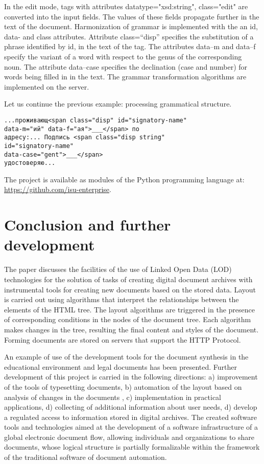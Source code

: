 \documentclass[12pt]{llncs}
\begin{document}
In the edit mode, tags with attributes
datatype="xsd:string", class="edit" are converted into the input
fields. The values of these fields propagate further in the text of the
document. Harmonization of grammar is implemented with the an id, data-
and class attributes. Attribute class=``disp'' specifies the
substitution of a phrase identified by id, in the text of the tag. The
attributes data--m and data--f specify the variant of a word with respect
to the genus of the corresponding noun. The attribute data--case
specifies the declination (case and number) for words being filled in in
the text. The grammar transformation algorithms are implemented on the
server.

Let us continue the previous example: processing grammatical structure.

\begin{verbatim}
...проживающ<span class="disp" id="signatory-name" 
data-m="ий" data-f="ая">___</span> по
адресу:... Подпись <span class="disp string"
id="signatory-name"
data-case="gent">___</span>
удостоверяю...
\end{verbatim}

The project is available as modules of the Python programming language
at: \url{https://github.com/isu-enterprise}.

\section{Conclusion and further development}
\label{sec:conc}

The paper discusses the facilities of the use of Linked Open Data (LOD)
technologies for the solution of tasks of {creating} digital document
archives with instrumental tools for creating new documents based on the
stored data. Layout is carried out using algorithms that interpret the
relationships between the elements of the HTML tree. The layout
algorithms are triggered in the presence of corresponding conditions in
the nodes of the document tree. Each algorithm makes changes in the
tree, resulting the final content and styles of the document. Forming
documents are stored on servers that support the HTTP Protocol.

An example of use of the development tools for the document synthesis in
the educational environment and legal documents has been presented.
Further development of this project is carried in the following
directions: a) improvement of the tools of typesetting documents, b)
automation of the layout based on analysis of changes in the documents
\cite{b2}, c) implementation in practical applications, d) collecting of
additional information about user needs, d) develop a regulated access
to information stored in digital archives. The created software tools
and technologies aimed at the development of a software infrastructure
of a global electronic document flow, allowing individuals and
organizations to share documents, whose logical structure is partially
formalizable within the framework of the traditional software of
document automation.
\end{document}
